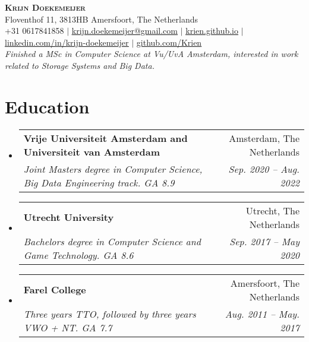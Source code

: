 \documentclass[letterpaper,11pt]{article}
\makeatletter
\newcommand{\resumeSubheading}[4]{
  \vspace{-2pt}\item
    \begin{tabular*}{0.97\textwidth}[t]{l@{\extracolsep{\fill}}r}
      \textbf{#1} & #2 \\
      \textit{\small#3} & \textit{\small #4} \\
    \end{tabular*}\vspace{-7pt}
}
\newcommand{\resumeSubHeadingListStart}{\begin{itemize}[leftmargin=0.15in, label={}]}
\newcommand{\resumeSubHeadingListEnd}{\end{itemize}}
\makeatother
\begin{document}

\begin{center}
    \textbf{\Huge \scshape Krijn Doekemeijer} \\ \vspace{1pt}
    \small Floventhof 11, 3813HB Amersfoort, The Netherlands \\ \vspace{1pt}
    \small +31 0617841858 $|$ \href{mailto:krijn.doekemeijer@gmail.com}{\underline{krijn.doekemeijer@gmail.com}} $|$ 
    \href{https://krien.github.io/}{\underline{krien.github.io}} $|$
    \href{https://linkedin.com/in/krijn-doekemeijer-9692801aa}{\underline{linkedin.com/in/krijn-doekemeijer}} $|$
    \href{https://github.com/Krien}{\underline{github.com/Krien}} \\
    \textit{ Finished a MSc in Computer Science at Vu/UvA Amsterdam, interested in work related to Storage Systems and Big Data. } 
\end{center}


\section{Education}
  \resumeSubHeadingListStart
     \resumeSubheading
      {Vrije Universiteit Amsterdam and Universiteit van Amsterdam}{Amsterdam, The Netherlands}
      {Joint Masters degree in Computer Science, Big Data Engineering track. GA 8.9}{Sep. 2020 -- Aug. 2022}
    \resumeSubheading
      {Utrecht University}{Utrecht, The Netherlands}
      {Bachelors degree in Computer Science and Game Technology. GA 8.6 }{Sep. 2017 -- May 2020}
    \resumeSubheading
      {Farel College}{Amersfoort, The Netherlands}
      {Three years TTO, followed by three years VWO + NT. GA 7.7 }{Aug. 2011 -- May. 2017}
  \resumeSubHeadingListEnd
\end{document}
